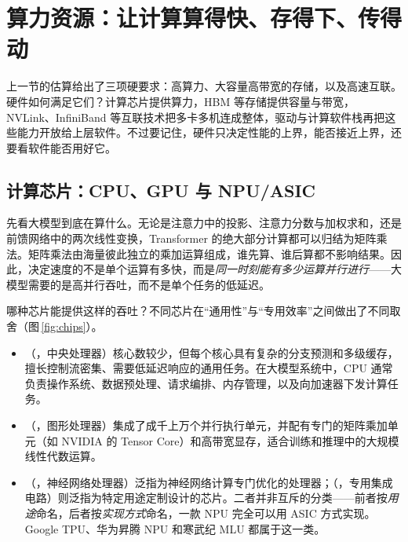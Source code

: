 \section{算力资源：让计算算得快、存得下、传得动}
\label{sec:hw}

\begin{guide}
\begin{minipage}[c]{0.66\linewidth}
\noindent 上一节的估算给出了三项硬要求：高算力、大容量高带宽的存储，以及高速互联。硬件如何满足它们？计算芯片提供算力，HBM 等存储提供容量与带宽，NVLink、InfiniBand 等互联技术把多卡多机连成整体，驱动与计算软件栈再把这些能力开放给上层软件。不过要记住，硬件只决定性能的上界，能否接近上界，还要看软件能否用好它。
\end{minipage}\hfill
\begin{minipage}[c]{0.3\linewidth}\centering
{}\end{minipage}
\end{guide}

\subsection{计算芯片：CPU、GPU 与 NPU/ASIC}
\label{subsec:chips}

先看大模型到底在算什么。无论是注意力中的投影、注意力分数与加权求和，还是前馈网络中的两次线性变换，Transformer 的绝大部分计算都可以归结为矩阵乘法。矩阵乘法由海量彼此独立的乘加运算组成，谁先算、谁后算都不影响结果。因此，决定速度的不是单个运算有多快，而是\emph{同一时刻能有多少运算并行进行}——大模型需要的是高并行吞吐，而不是单个任务的低延迟。

哪种芯片能提供这样的吞吐？不同芯片在“通用性”与“专用效率”之间做出了不同取舍（图\,\ref{fig:chips}）。
\begin{itemize}
  \item {}（，中央处理器）核心数较少，但每个核心具有复杂的分支预测和多级缓存，擅长控制流密集、需要低延迟响应的通用任务。在大模型系统中，CPU 通常负责操作系统、数据预处理、请求编排、内存管理，以及向加速器下发计算任务。
  \item {}（，图形处理器）集成了成千上万个并行执行单元，并配有专门的矩阵乘加单元（如 NVIDIA 的 Tensor Core）和高带宽显存，适合训练和推理中的大规模线性代数运算\cite{hwu2026pmpp}。
  \item {}（，神经网络处理器）泛指为神经网络计算专门优化的处理器；（，专用集成电路）则泛指为特定用途定制设计的芯片。二者并非互斥的分类——前者按\emph{用途}命名，后者按\emph{实现方式}命名，一款 NPU 完全可以用 ASIC 方式实现。Google TPU、华为昇腾 NPU 和寒武纪 MLU 都属于这一类。
\end{itemize}

